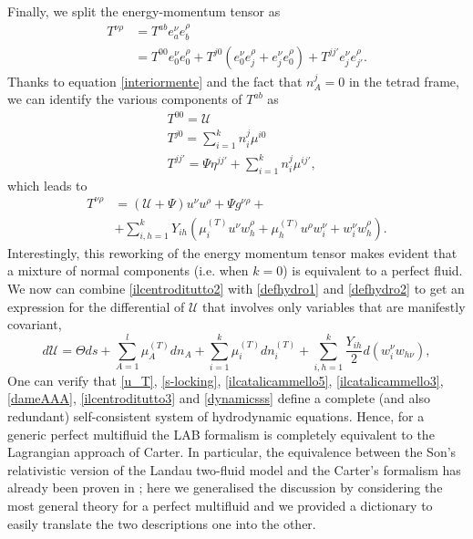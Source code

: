 \documentclass[usenatbib]{mnras}
\begin{document}
Finally, we split the energy-momentum tensor as
%
\begin{equation}
\begin{split}
T^{\nu \rho}& =  T^{ab}e_a^\nu e_b^\rho  \\
& = T^{00}e_0^\nu e_0^\rho + T^{j0}(e_0^\nu e_j^\rho + e_j^\nu e_0^\rho) + T^{jj'}e_j^\nu e_{j'}^\rho.
\end{split}
\end{equation}
%
Thanks to equation \eqref{interiormente} and the fact that  $n_A^j =0$ in the tetrad frame, we can identify the various components of $T^{ab}$ as
%
\begin{equation}
\begin{split}
& T^{00} = \mathcal{U} \\
& T^{j0} =\sum_{i=1}^k n_{i}^j \mu^{i0} \\
& T^{jj'} = \Psi \eta^{jj'} + \sum_{i=1}^k n_{i}^j \mu^{ij'} ,
\end{split}
\end{equation}
%
which leads to
%
\begin{equation}
\label{dameAAA}
\begin{split}
 T^{\nu \rho} &= (\mathcal{U} + \Psi) u^\nu u^\rho + \Psi g^{\nu \rho}   + \\
& + \sum_{i,h=1}^k Y_{ih} (\mu_{i}^{(T)} u^\nu w^{\rho}_h + \mu_{h}^{(T)} u^\rho w^{\nu}_i + w^{\nu}_i w^{\rho}_h).
\end{split}
\end{equation}
%
Interestingly, this reworking of the energy momentum tensor makes evident that a mixture of normal components (i.e. when $k=0$) is equivalent to a perfect fluid.
We now can combine \eqref{ilcentroditutto2} with \eqref{defhydro1} and \eqref{defhydro2} to get an expression for the differential of $\mathcal{U}$ that involves only variables that are manifestly covariant, 
%
\begin{equation}\label{ilcentroditutto3}
d\mathcal{U} =\Theta ds + \sum_{A=1}^l \mu_A^{(T)} dn_A + \sum_{i=1}^k \mu_i^{(T)} dn_i^{(T)} + \sum_{i,h=1}^k \dfrac{Y_{ih}}{2}  d(w_{i}^\nu w_{h\nu}),
\end{equation}
%
One can verify that  \eqref{u_T}, \eqref{s-locking}, \eqref{ilcatalicammello5}, \eqref{ilcatalicammello3},  \eqref{dameAAA}, \eqref{ilcentroditutto3} and \eqref{dynamicsss} define a complete (and also redundant) self-consistent system of hydrodynamic equations. 
Hence, for a generic perfect multifluid the LAB formalism is completely equivalent to the Lagrangian approach of Carter. 
In particular, the equivalence between the Son's relativistic version of the Landau two-fluid model and the Carter's formalism has already been proven in \cite{andersson2007review}; here we generalised the discussion by considering the most general theory for a perfect multifluid and we provided a dictionary to easily translate the two descriptions one into the other. 
\end{document}

